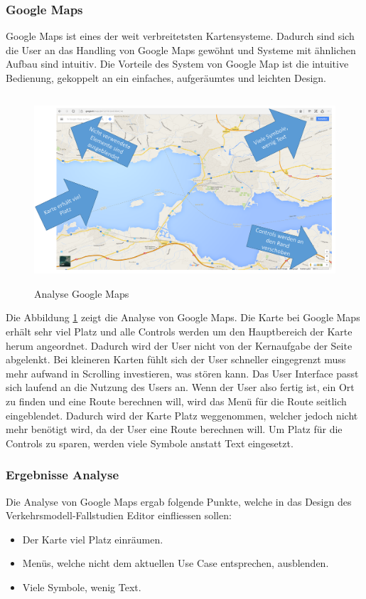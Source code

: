 \subsubsection{Google Maps}
Google Maps ist eines der weit verbreitetsten Kartensysteme. Dadurch sind sich die User an das Handling von Google Maps gewöhnt und Systeme mit ähnlichen Aufbau sind intuitiv. Die Vorteile des System von Google Map ist die intuitive Bedienung, gekoppelt an ein einfaches, aufgeräumtes und leichten Design.
\begin{figure}[H]
\centering
\includegraphics[height=7cm]{images/AnalyseGoogle.png}
\caption{Analyse Google Maps}
\label{fig:googlemaps}
\end{figure}
\noindent
Die Abbildung \ref{fig:googlemaps}  zeigt die Analyse von Google Maps. Die Karte bei Google Maps erhält sehr viel Platz und alle Controls werden um den Hauptbereich der Karte herum angeordnet. Dadurch wird der User nicht von der Kernaufgabe der Seite abgelenkt. Bei kleineren Karten fühlt sich der User schneller eingegrenzt muss mehr aufwand in Scrolling investieren, was stören kann. Das User Interface passt sich laufend an die Nutzung des Users an. Wenn der User also fertig ist, ein Ort zu finden und eine Route berechnen will, wird das Menü für die Route seitlich eingeblendet. Dadurch wird der Karte Platz weggenommen, welcher jedoch nicht mehr benötigt wird, da der User eine Route berechnen will. Um Platz für die Controls zu sparen, werden viele Symbole anstatt Text eingesetzt.
\subsubsection*{Ergebnisse Analyse}
Die Analyse von Google Maps ergab folgende Punkte, welche in das Design des Verkehrsmodell-Fallstudien Editor einfliessen sollen:
\begin{itemize}
\item Der Karte viel Platz einräumen.
\item Menüs, welche nicht dem aktuellen Use Case entsprechen, ausblenden.
\item Viele Symbole, wenig Text.
\end{itemize}
